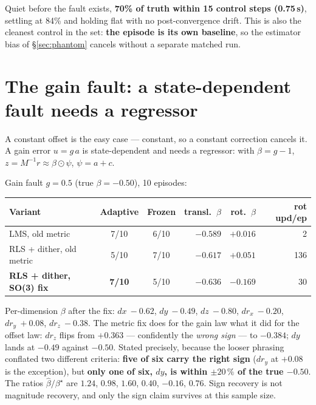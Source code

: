 \documentclass[11pt,a4paper]{article}
\begin{document}
Quiet before the fault exists, \textbf{70\% of truth within 15 control steps
(0.75\,s)}, settling at 84\% and holding flat with no post-convergence drift.
This is also the cleanest control in the set: \textbf{the episode is its own
baseline}, so the estimator bias of \S\ref{sec:phantom} cancels without a
separate matched run.

\section{The gain fault: a state-dependent fault needs a regressor}
\label{sec:gain}

A constant offset is the easy case --- constant, so a constant correction cancels
it. A gain error $u = g\,a$ is state-dependent and needs a regressor: with
$\beta = g-1$, $z = M^{-1} r \approx \beta \odot \psi$, $\psi = a + c$.

Gain fault $g = 0.5$ (true $\beta = -0.50$), 10 episodes:

\begin{center}
\begin{tabular}{lccrrr}
\toprule
\textbf{Variant} & \textbf{Adaptive} & \textbf{Frozen} & \textbf{transl.\ $\beta$} & \textbf{rot.\ $\beta$} & \textbf{rot upd/ep} \\
\midrule
LMS, old metric            & 7/10 & 6/10 & $-0.589$ & $+0.016$ & 2 \\
RLS + dither, old metric   & 5/10 & 7/10 & $-0.617$ & $+0.051$ & 136 \\
\textbf{RLS + dither, SO(3) fix} & \textbf{7/10} & 5/10 & $-0.636$ & $-0.169$ & 30 \\
\bottomrule
\end{tabular}
\end{center}

Per-dimension $\beta$ after the fix: $dx\ {-}0.62$, $dy\ {-}0.49$, $dz\ {-}0.80$,
$d r_x\ {-}0.20$, $d r_y\ {+}0.08$, $d r_z\ {-}0.38$. The metric fix does for the
gain law what it did for the offset law: $d r_z$ flips from $+0.363$ ---
confidently the \emph{wrong sign} --- to $-0.384$; $dy$ lands at $-0.49$ against
$-0.50$. Stated precisely, because the looser phrasing conflated two
different criteria: \textbf{five of six carry the right sign} ($d r_y$ at $+0.08$ is
the exception), but \textbf{only one of six, $dy$, is within $\pm 20\,\%$ of the true
$-0.50$}. The ratios $\hat\beta/\beta^\star$ are $1.24$, $0.98$, $1.60$, $0.40$,
$-0.16$, $0.76$. Sign recovery is not magnitude recovery, and only the sign claim
survives at this sample size.
\end{document}

